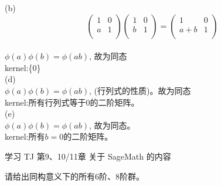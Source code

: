 \documentclass[a4paper, justified]{tufte-handout}
\begin{document}
\begin{solution}
(b)\\
 $$\begin{pmatrix}1&0\\
			   a&1\\
     \end{pmatrix}
     \begin{pmatrix}1&0\\
			   b&1\\
     \end{pmatrix}
     =
   \begin{pmatrix}1&0\\
			   a+b&1\\
     \end{pmatrix}$$\\
$\phi(a)\phi(b)=\phi(ab)$, 故为同态\\
kernel:\{0\}\\
(d)\\
$\phi(a)\phi(b)=\phi(ab)$, (行列式的性质)。故为同态\\
kernel:所有行列式等于$0$的二阶矩阵。\\
(e)\\
$\phi(a)\phi(b)=\phi(ab)$, 故为同态。\\
kernel:所有$b=0$的二阶矩阵。\\
\end{solution}


\beginoptional


\begin{problem}[SageMath学习]
学习 TJ 第9、10/11章 关于 SageMath 的内容
\end{problem}

\begin{solution}
\end{solution}

\begin{problem}[TJ 11-17]
\end{problem}

\begin{solution}
\end{solution}


\begin{problem}[6、8阶群]
请给出同构意义下的所有6阶、8阶群。
\end{problem}

\begin{solution}
\end{solution}
\end{document}

